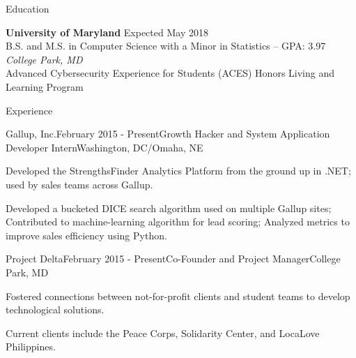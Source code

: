 \documentclass{resume} %
\begin{document}

\begin{rSection}{Education}

{\bf University of Maryland} \hfill {Expected May 2018} \\ 
{B.S. and M.S. in Computer Science with a Minor in Statistics -- GPA: 3.97} \hfill {\em College Park, MD} \\
Advanced Cybersecurity Experience for Students (ACES) Honors Living and Learning Program

\end{rSection}


\begin{rSection}{Experience}

\begin{rSubsection}{Gallup, Inc.}{February 2015 - Present}{Growth Hacker and System Application Developer Intern}{Washington, DC/Omaha, NE}
\item Developed the StrengthsFinder Analytics Platform from the ground up in .NET; used by sales teams across Gallup.
\item Developed a bucketed DICE search algorithm used on multiple Gallup sites; Contributed to machine-learning algorithm for lead scoring; Analyzed metrics to improve sales efficiency using Python.
\end{rSubsection}

\begin{rSubsection}{Project Delta}{February 2015 - Present}{Co-Founder and Project Manager}{College Park, MD}
\item Fostered connections between not-for-profit clients and student teams to develop technological solutions.
\item Current clients include the Peace Corps, Solidarity Center, and LocaLove Philippines.
\end{rSubsection}



\end{rSection}
\end{document}
